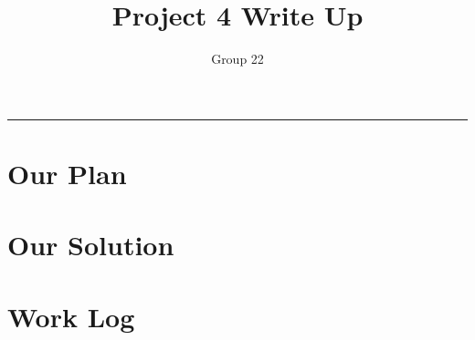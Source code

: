 \documentclass[letterpaper,10pt,notitlepage,fleqn]{article}
\title{Project 4 Write Up}
\author{Group 22}
\begin{document}
\maketitle
\hrule

\section*{Our Plan}
    
\section*{Our Solution}
   
\section*{Work Log}
\end{document}
